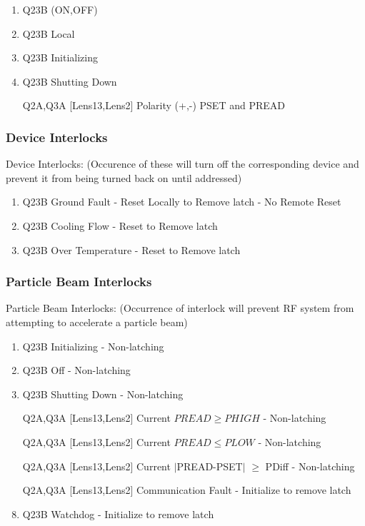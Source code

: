 \documentclass[11pt]{book}		%
\begin{document}
\begin{enumerate}
 \item Q23B (ON,OFF)
 \item Q23B Local
 \item Q23B Initializing
 \item Q23B Shutting Down
 \item [Q2A,Q3A] [Lens13,Lens2] Polarity (+,-) PSET and PREAD
\end{enumerate}

\subsubsection{Device Interlocks}\label{sect:cyc-op-interface-status-beamline-tofc1-state-monitors-device-interlocks}

Device Interlocks:
(Occurence of these will turn off the corresponding device and prevent it from being turned back on until addressed)

\begin{enumerate}
 \item Q23B Ground Fault - Reset Locally to Remove latch - No Remote Reset
 \item Q23B Cooling Flow - Reset to Remove latch
 \item Q23B Over Temperature - Reset to Remove latch
\end{enumerate}

\subsubsection{Particle Beam Interlocks}\label{sect:cyc-op-interface-status-beamline-tofc1-state-monitors-beam-interlocks}

Particle Beam Interlocks:
(Occurrence of interlock will prevent RF system from attempting to accelerate a particle beam)

\begin{enumerate}
 \item Q23B Initializing - Non-latching
 \item Q23B Off - Non-latching
 \item Q23B Shutting Down - Non-latching
 \item [Q2A,Q3A] [Lens13,Lens2] Current $PREAD \geq PHIGH$ - Non-latching
 \item [Q2A,Q3A] [Lens13,Lens2] Current $PREAD \leq PLOW$ - Non-latching
 \item [Q2A,Q3A] [Lens13,Lens2] Current $\mid$PREAD-PSET$\mid$  $\geq$ PDiff - Non-latching
 \item [Q2A,Q3A] [Lens13,Lens2] Communication Fault - Initialize to remove latch
 \item Q23B Watchdog - Initialize to remove latch
\end{enumerate}
\end{document}
